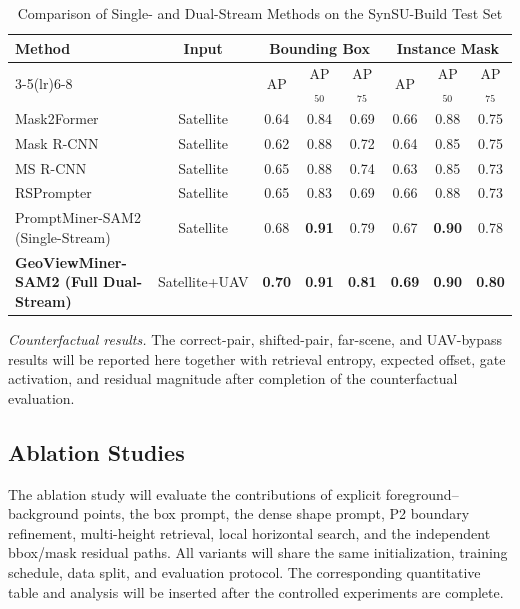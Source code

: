 \documentclass[letterpaper,journal]{IEEEtran}
\begin{document}
\begin{table}[!t]
\caption{Comparison of Single- and Dual-Stream Methods on the SynSU-Build Test Set}
\label{tab:synsu_dual}
\centering
\small
\begin{tabular}{lccccccc}
\toprule
\multirow{2}{*}{Method} & \multirow{2}{*}{Input} & \multicolumn{3}{c}{Bounding Box} & \multicolumn{3}{c}{Instance Mask} \\
\cmidrule(lr){3-5}\cmidrule(lr){6-8}
& & AP & AP$_{50}$ & AP$_{75}$ & AP & AP$_{50}$ & AP$_{75}$ \\
\midrule
Mask2Former~\cite{ref_mask2former} & Satellite & 0.64 & 0.84 & 0.69 & 0.66 & 0.88 & 0.75 \\
Mask R-CNN~\cite{ref_maskrcnn} & Satellite & 0.62 & 0.88 & 0.72 & 0.64 & 0.85 & 0.75 \\
MS R-CNN~\cite{ref_msrcnn} & Satellite & 0.65 & 0.88 & 0.74 & 0.63 & 0.85 & 0.73 \\
RSPrompter~\cite{ref_rsprompter} & Satellite & 0.65 & 0.83 & 0.69 & 0.66 & 0.88 & 0.73 \\
PromptMiner-SAM2 (Single-Stream) & Satellite & 0.68 & \textbf{0.91} & 0.79 & 0.67 & \textbf{0.90} & 0.78 \\
\textbf{GeoViewMiner-SAM2 (Full Dual-Stream)} & Satellite+UAV & \textbf{0.70} & \textbf{0.91} & \textbf{0.81} & \textbf{0.69} & \textbf{0.90} & \textbf{0.80} \\
\bottomrule
\end{tabular}
\end{table}

\noindent\textit{Counterfactual results.}
The correct-pair, shifted-pair, far-scene, and UAV-bypass results will be reported here together with retrieval entropy, expected offset, gate activation, and residual magnitude after completion of the counterfactual evaluation.

\subsection{Ablation Studies}
\label{sec:ablations}
The ablation study will evaluate the contributions of explicit foreground--background points, the box prompt, the dense shape prompt, P2 boundary refinement, multi-height retrieval, local horizontal search, and the independent bbox/mask residual paths. All variants will share the same initialization, training schedule, data split, and evaluation protocol. The corresponding quantitative table and analysis will be inserted after the controlled experiments are complete.
\end{document}
